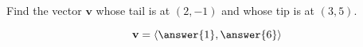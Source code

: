 \documentclass{ximera}
\author{Gregory Hartman \and Matthew Carr}
\begin{document}
\begin{exercise}



Find the vector $\mathbf{v}$ whose tail is at $(2,-1)$ and whose tip is at $(3,5)$.

\begin{prompt}
\[
\mathbf{v}=\left\langle\answer{1},\answer{6}\right\rangle
\]
\end{prompt}

\end{exercise}
\end{document}
